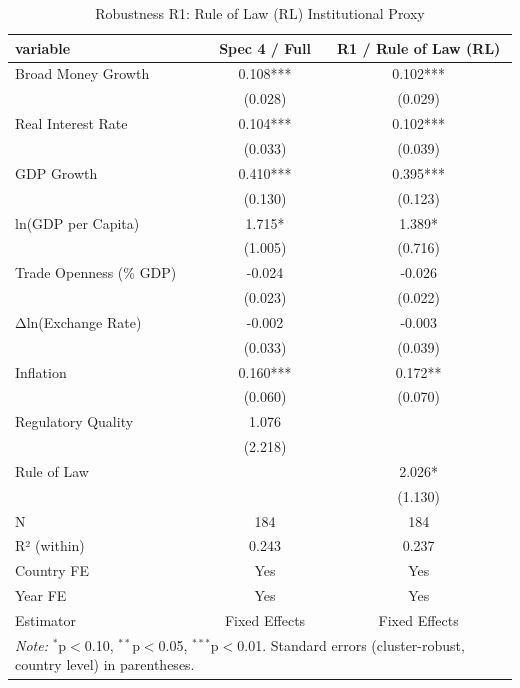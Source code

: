 \begin{table}[htbp]
\centering
\caption{Robustness R1: Rule of Law (RL) Institutional Proxy}
\label{tab:robustness_r1_rl}
\begin{tabular}{lcc}
\hline\hline
variable & Spec 4 / Full & R1 / Rule of Law (RL) \\
\hline
Broad Money Growth & 0.108*** & 0.102*** \\
 & (0.028) & (0.029) \\
Real Interest Rate & 0.104*** & 0.102*** \\
 & (0.033) & (0.039) \\
GDP Growth & 0.410*** & 0.395*** \\
 & (0.130) & (0.123) \\
ln(GDP per Capita) & 1.715* & 1.389* \\
 & (1.005) & (0.716) \\
Trade Openness (\% GDP) & -0.024 & -0.026 \\
 & (0.023) & (0.022) \\
Δln(Exchange Rate) & -0.002 & -0.003 \\
 & (0.033) & (0.039) \\
Inflation & 0.160*** & 0.172** \\
 & (0.060) & (0.070) \\
Regulatory Quality & 1.076 &  \\
 & (2.218) &  \\
Rule of Law &  & 2.026* \\
 &  & (1.130) \\
\hline
N & 184 & 184 \\
R² (within) & 0.243 & 0.237 \\
Country FE & Yes & Yes \\
Year FE & Yes & Yes \\
Estimator & Fixed Effects & Fixed Effects \\
\hline\hline
\multicolumn{3}{l}{\textit{Note:} $^{*}$p$<$0.10, $^{**}$p$<$0.05, $^{***}$p$<$0.01. Standard errors (cluster-robust, country level) in parentheses.}
\end{tabular}
\end{table}